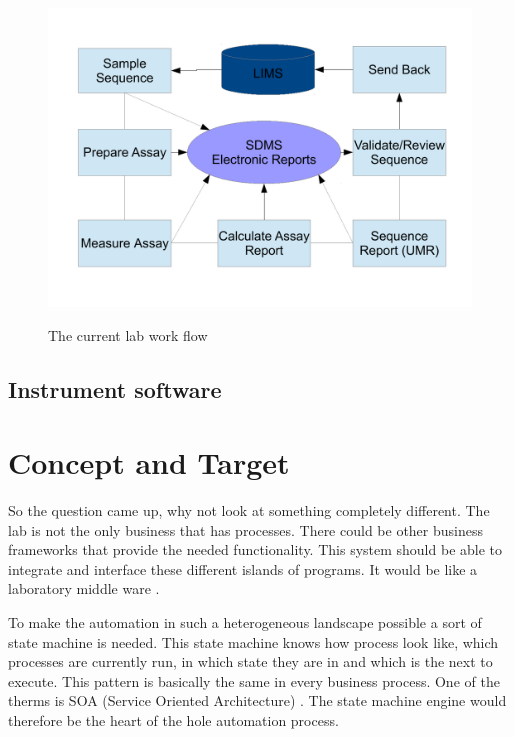 \documentclass[paper=a4,twoside=false,BCOR=0mm,DIV=calc,fontsize=12pt]{scrartcl}
\begin{document}
\begin{figure}
    \begin{center}
      \includegraphics[width=1\textwidth]{./img/Laboverview.pdf}\\
    \end{center}
  \caption{The current lab work flow}
  \label{CurrentLabWorkflow}
\end{figure} 

\subsection{Instrument software}


\section{Concept and Target}
So the question came up, why not look at something completely different. The lab is not the only business that has processes. There could be other business frameworks that provide the needed functionality. This system should be able to integrate and interface these different islands of programs. It would be like a laboratory middle ware \cite{middleware}. 


To make the automation in such a heterogeneous landscape possible a sort of state machine is needed. This state machine knows how process look like, which processes are currently run, in which state they are in and which is the next to execute.
This pattern is basically the same in every business process. One of the therms is SOA (Service Oriented Architecture) \cite{soa}. The state machine engine would therefore be the heart of the hole automation process.
\end{document}
